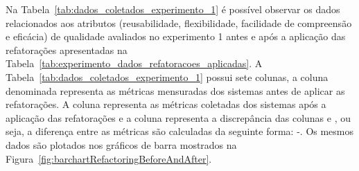 Na Tabela~\ref{tab:dados_coletados_experimento_1} é possível observar os dados relacionados aos atributos (reusabilidade, flexibilidade, facilidade de compreensão e eficácia) de qualidade avaliados no experimento 1 antes e após a aplicação das refatorações apresentadas na Tabela~\ref{tab:experimento_dados_refatoracoes_aplicadas}. A Tabela~\ref{tab:dados_coletados_experimento_1} possui sete colunas, a coluna denominada  representa as métricas mensuradas dos sistemas antes de aplicar as refatorações. A coluna  representa as métricas coletadas dos sistemas após a aplicação das refatorações e a coluna  representa a discrepância das colunas  e , ou seja, a diferença entre as métricas são calculadas da seguinte forma: -. Os mesmos dados são plotados nos gráficos de barra mostrados na Figura~\ref{fig:barchartRefactoringBeforeAndAfter}. 



